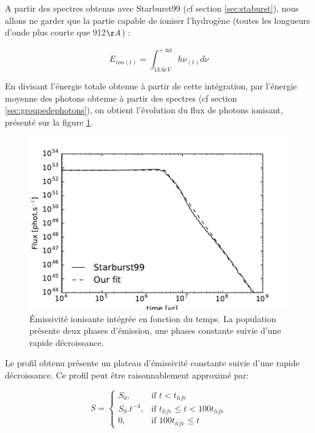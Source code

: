 

A partir des spectres obtenus avec Starburst99 (cf section \ref{sec:staburst}), nous allons ne garder que la partie capable de ioniser l'hydrogène (toutes les longueurs d'onde plus courte que 912$\AA$) :

\begin{equation}
E_{ion (t)} = \int_{13.6eV}^{+\inf} h \nu_{(t)} d\nu
\end{equation}

En divisant l'énergie totale obtenue à partir de cette intégration, par l'énergie moyenne des photons obtenue à partir des spectres (cf section \ref{sec:groupedephotons}), on obtient l'évolution du flux de photons ionisant, présenté sur la figure \ref{fig:flux}.
\begin{figure}
        \includegraphics[width=.95\linewidth]{img/03/flux.pdf} 
        \caption[Émissivité ionisante]{Émissivité ionisante intégrée en fonction du temps.
        La population présente deux phases d'émission, une phases constante suivie d'une rapide décroissance.
 		\label{fig:flux}}
\end{figure}
Le profil obtenu présente un plateau d'émissivité constante suivie d'une rapide décroissance.
Ce profil peut être raisonnablement approximé par:

\begin{equation}
    S = 
\begin{cases}
    S_0 ,         & \text{if } t < t_{life}\\
    S_0.t^{-4},   & \text{if } t_{life} \leq t < 100t_{life} \\
    0,   & \text{if } 100t_{life} \leq t
\end{cases}
\end{equation}

